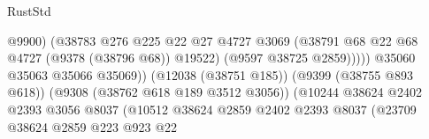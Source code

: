 \begin{lexlean}{RustStd}
\begin{coremodule}
                                                            @9900)
                                                          (@38783
                                                            @276
                                                            @225
                                                            @22
                                                            @27
                                                            @4727
                                                            @3069
                                                            (@38791
                                                              @68
                                                              @22
                                                              @68
                                                              @4727
                                                              (@9378 (@38796 @68))
                                                              @19522)
                                                            (@9597 @38725 @2859)))))
                                                    @35060
                                                    @35063
                                                    @35066
                                                    @35069))
                                                (@12038 (@38751 @185))
                                                (@9399 (@38755 @893 @618))
                                                (@9308 (@38762 @618 @189 @3512 @3056))
                                                (@10244
                                                  @38624
                                                  @2402
                                                  @2393
                                                  @3056
                                                  @8037
                                                  (@10512
                                                    @38624
                                                    @2859
                                                    @2402
                                                    @2393
                                                    @8037
                                                    (@23709
                                                      @38624
                                                      @2859
                                                      @223
                                                      @923
                                                      @22

\end{coremodule}
\end{lexlean}
